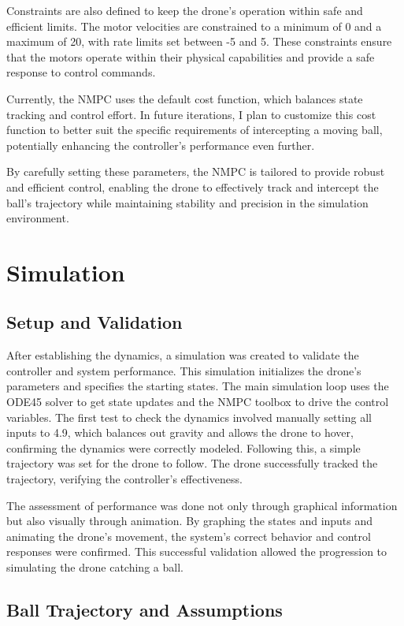 \documentclass{UoNMCHA}
\numberwithin{equation}{section}
\begin{document}
Constraints are also defined to keep the drone's operation within safe and efficient limits. The motor velocities are constrained to a minimum of 0 and a maximum of 20, with rate limits set between -5 and 5. These constraints ensure that the motors operate within their physical capabilities and provide a safe response to control commands.

Currently, the NMPC uses the default cost function, which balances state tracking and control effort. In future iterations, I plan to customize this cost function to better suit the specific requirements of intercepting a moving ball, potentially enhancing the controller's performance even further.

By carefully setting these parameters, the NMPC is tailored to provide robust and efficient control, enabling the drone to effectively track and intercept the ball's trajectory while maintaining stability and precision in the simulation environment.

\section{Simulation}
\subsection{Setup and Validation}

After establishing the dynamics, a simulation was created to validate the controller and system performance. This simulation initializes the drone's parameters and specifies the starting states. The main simulation loop uses the ODE45 solver \cite{website:KalmanFilter} to get state updates and the NMPC toolbox \cite{website:NMPCSIM} to drive the control variables. The first test to check the dynamics involved manually setting all inputs to 4.9, which balances out gravity and allows the drone to hover, confirming the dynamics were correctly modeled. Following this, a simple trajectory was set for the drone to follow. The drone successfully tracked the trajectory, verifying the controller's effectiveness.

The assessment of performance was done not only through graphical information but also visually through animation. By graphing the states and inputs and animating the drone's movement, the system's correct behavior and control responses were confirmed. This successful validation allowed the progression to simulating the drone catching a ball.

\subsection{Ball Trajectory and Assumptions}
\end{document}
